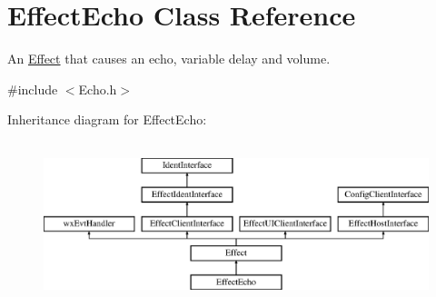 \hypertarget{class_effect_echo}{}\section{Effect\+Echo Class Reference}
\label{class_effect_echo}


An \hyperlink{class_effect}{Effect} that causes an echo, variable delay and volume.  




{\ttfamily \#include $<$Echo.\+h$>$}

Inheritance diagram for Effect\+Echo\+:\begin{figure}[H]
\begin{center}
\leavevmode
\includegraphics[height=4.794520cm]{class_effect_echo}
\end{center}
\end{figure}
